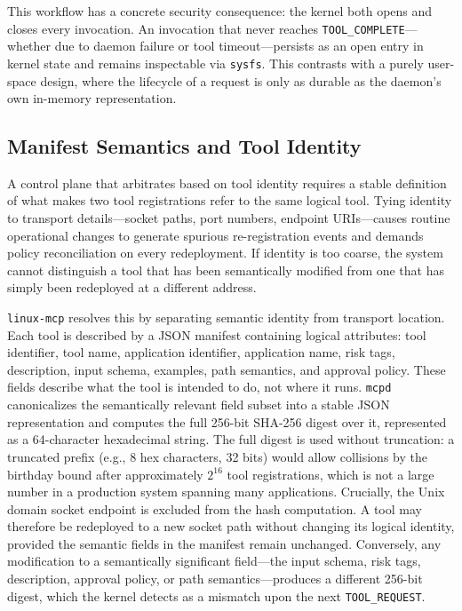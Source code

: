 This workflow has a concrete security consequence: the kernel both opens and closes every invocation.
An invocation that never reaches \texttt{TOOL\_COMPLETE}---whether due to daemon failure or tool timeout---persists as an open entry in kernel state and remains inspectable via \texttt{sysfs}.
This contrasts with a purely user-space design, where the lifecycle of a request is only as durable as the daemon's own in-memory representation.



\subsection{Manifest Semantics and Tool Identity}

A control plane that arbitrates based on tool identity requires a stable definition of what makes two tool registrations refer to the same logical tool.
Tying identity to transport details---socket paths, port numbers, endpoint URIs---causes routine operational changes to generate spurious re-registration events and demands policy reconciliation on every redeployment.
If identity is too coarse, the system cannot distinguish a tool that has been semantically modified from one that has simply been redeployed at a different address.

\texttt{linux-mcp} resolves this by separating semantic identity from transport location.
Each tool is described by a JSON manifest containing logical attributes: tool identifier, tool name, application identifier, application name, risk tags, description, input schema, examples, path semantics, and approval policy.
These fields describe what the tool is intended to do, not where it runs.
\texttt{mcpd} canonicalizes the semantically relevant field subset into a stable JSON representation and computes the full 256-bit SHA-256 digest over it, represented as a 64-character hexadecimal string.
The full digest is used without truncation: a truncated prefix (e.g., 8 hex characters, 32 bits) would allow collisions by the birthday bound after approximately $2^{16}$ tool registrations, which is not a large number in a production system spanning many applications.
Crucially, the Unix domain socket endpoint is excluded from the hash computation.
A tool may therefore be redeployed to a new socket path without changing its logical identity, provided the semantic fields in the manifest remain unchanged.
Conversely, any modification to a semantically significant field---the input schema, risk tags, description, approval policy, or path semantics---produces a different 256-bit digest, which the kernel detects as a mismatch upon the next \texttt{TOOL\_REQUEST}.

